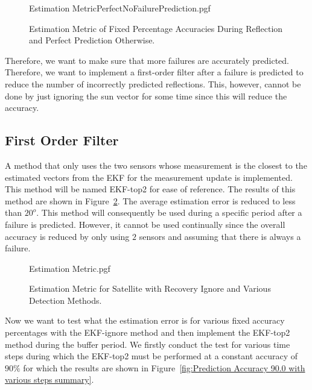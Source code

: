 \documentclass[letterpaper, 10 pt, conference]{ieeeconf}  %
\begin{document}
\begin{figure}[!htb]
	\begin{center}
		{Estimation MetricPerfectNoFailurePrediction.pgf}
	\end{center}
	\caption[Estimation Metric of Fixed Percentage Accuracies During Failures and Perfect Prediction During No Failures]{Estimation Metric of Fixed Percentage Accuracies During Reflection and Perfect Prediction Otherwise.}
	\label{fig:Estimation Accuracy EKF-ignore Comparison PerfectNoFailure}
\end{figure}

Therefore, we want to make sure that more failures are accurately predicted. Therefore, we want to implement a first-order filter after a failure is predicted to reduce the number of incorrectly predicted reflections. This, however, cannot be done by just ignoring the sun vector for some time since this will reduce the accuracy.

\subsection{First Order Filter}
\label{section:First Order Filter}
A method that only uses the two sensors whose measurement is the closest to the estimated vectors from the EKF for the measurement update is implemented. This method will be named EKF-top2 for ease of reference. The results of this method are shown in Figure~\ref{fig:Estimation Accuracy EKF-top2 summary}. The average estimation error is reduced to less than $20^o$. This method will consequently be used during a specific period after a failure is predicted. However, it cannot be used continually since the overall accuracy is reduced by only using $2$ sensors and assuming that there is always a failure.

\begin{figure}[!htb]
	\begin{center}
		{Estimation Metric.pgf}
	\end{center}
	\caption[Estimation Metric for Satellite with Recovery Ignore and Various detection Methods]{Estimation Metric for Satellite with Recovery Ignore and Various Detection Methods.}
	\label{fig:Estimation Accuracy EKF-top2 summary}
\end{figure}

Now we want to test what the estimation error is for various fixed accuracy percentages with the EKF-ignore method and then implement the EKF-top2 method during the buffer period. We firstly conduct the test for various time steps during which the EKF-top2 must be performed at a constant accuracy of $90\%$ for which the results are shown in Figure~\ref{fig:Prediction Accuracy 90.0 with various steps summary}. 
\end{document}
